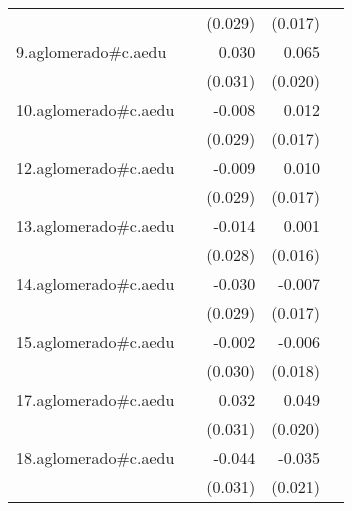 {\begin{longtable}{l*{4}{D{.}{.}{-1}}}
            &                     &     (0.029)         &     (0.017)         &                     \\
\addlinespace
9.aglomerado#c.aedu&                     &       0.030         &       0.065\sym{**} &                     \\
            &                     &     (0.031)         &     (0.020)         &                     \\
\addlinespace
10.aglomerado#c.aedu&                     &      -0.008         &       0.012         &                     \\
            &                     &     (0.029)         &     (0.017)         &                     \\
\addlinespace
12.aglomerado#c.aedu&                     &      -0.009         &       0.010         &                     \\
            &                     &     (0.029)         &     (0.017)         &                     \\
\addlinespace
13.aglomerado#c.aedu&                     &      -0.014         &       0.001         &                     \\
            &                     &     (0.028)         &     (0.016)         &                     \\
\addlinespace
14.aglomerado#c.aedu&                     &      -0.030         &      -0.007         &                     \\
            &                     &     (0.029)         &     (0.017)         &                     \\
\addlinespace
15.aglomerado#c.aedu&                     &      -0.002         &      -0.006         &                     \\
            &                     &     (0.030)         &     (0.018)         &                     \\
\addlinespace
17.aglomerado#c.aedu&                     &       0.032         &       0.049\sym{*}  &                     \\
            &                     &     (0.031)         &     (0.020)         &                     \\
\addlinespace
18.aglomerado#c.aedu&                     &      -0.044         &      -0.035         &                     \\
            &                     &     (0.031)         &     (0.021)         &                     \\

\end{longtable}}
